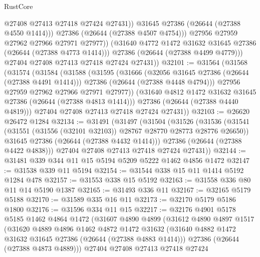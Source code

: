\begin{lexlean}{RustCore}
\begin{coremodule}
                      @27408
                      @27413
                      @27418
                      @27424
                      @27431))
                  @31645
                  @27386
                  (@26644 (@27388 @4550 @1414)))
                @27386
                (@26644 (@27388 @4507 @4754)))
              @27956
              @27959
              @27962
              @27966
              @27971
              @27977))
          (@31640 @4772 @1472 @31632 @31645 @27386 (@26644 (@27388 @4773 @1414)))
          @27386
          (@26644 (@27388 @4499 @4779)))
        @27404
        @27408
        @27413
        @27418
        @27424
        @27431))
@32101 := @31564
    (@31568
      (@31574
        (@31584
          (@31588
            (@31595
              (@31666
                (@32056 @31645 @27386 (@26644 (@27388 @4491 @1414)))
                @27386
                (@26644 (@27388 @4448 @4794)))
              @27956
              @27959
              @27962
              @27966
              @27971
              @27977))
          (@31640 @4812 @1472 @31632 @31645 @27386 (@26644 (@27388 @4813 @1414)))
          @27386
          (@26644 (@27388 @4440 @4819)))
        @27404
        @27408
        @27413
        @27418
        @27424
        @27431))
@32103 := @26620 @26472 @1284
@32134 := @31491
    (@31497
      (@31504
        (@31526
          (@31536
            (@31541 (@31551 (@31556 (@32101 @32103)) @28767 @28770 @28773 @28776 @26650))
            @31645
            @27386
            (@26644 (@27388 @4432 @1414)))
          @27386
          (@26644 (@27388 @4422 @4838)))
        @27404
        @27408
        @27413
        @27418
        @27424
        @27431))
@32144 := @31481 @339 @344 @11 @15 @5194 @5209 @5222 @1462 @4856 @1472
@32147 := @31538 @339 @11 @5194
@32154 := @31544 @338 @15 @11 @1414 @5192 @1284 @478
@32157 := @31553 @338 @15 @5192
@32163 := @31558 @336 @80 @11 @14 @5190 @1387
@32165 := @31493 @336 @11
@32167 := @32165 @5179 @5188
@32170 := @31589 @335 @16 @11
@32173 := @32170 @5179 @5186 @1800
@32176 := @31596 @334 @11 @15
@32217 := @32176
    @4901
    @5178
    @5185
    @1462
    @4864
    @1472
    (@31607
      @4890
      @4899
      (@31612
        @4890
        @4897
        @1517
        (@31620
          @4889
          @4896
          @1462
          @4872
          @1472
          @31632
          (@31640 @4882 @1472 @31632 @31645 @27386 (@26644 (@27388 @4883 @1414)))
          @27386
          (@26644 (@27388 @4873 @4889)))
        @27404
        @27408
        @27413
        @27418
        @27424

\end{coremodule}
\end{lexlean}
